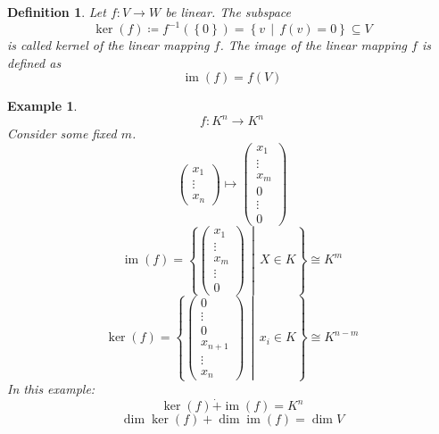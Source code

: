 \documentclass[a4paper,landscape,twocolumn]{article}
\newcommand\set[1]{\left\{#1\right\}}
\newcommand\setdef[2]{\left\{#1\,\middle|\,#2\right\}}
\newtheorem{defi}{Definition}
\newtheorem{ex}{Example}
\begin{document}
\begin{defi}
  Let $f: V \rightarrow W$ be linear.
  The subspace
  \[ \operatorname{ker}(f) \coloneqq f^{-1}(\set{0}) = \setdef{v}{f(v) = 0} \subseteq V \]
  is called \emph{kernel} of the linear mapping $f$.
  The \emph{image} of the linear mapping $f$ is defined as
  \[ \operatorname{im}(f) = f(V) \]
\end{defi}
%
\begin{ex}
  \[ f: K^n \rightarrow K^n \]
  Consider some fixed $m$.
  \[
    \begin{pmatrix} x_1 \\ \vdots \\ x_n \end{pmatrix}
    \mapsto
    \begin{pmatrix} x_1 \\ \vdots \\ x_m \\ 0 \\ \vdots \\ 0 \end{pmatrix}
  \]
  \[
    \operatorname{im}(f) = \setdef{\begin{pmatrix} x_1 \\ \vdots \\ x_m \\ \vdots \\ 0 \end{pmatrix}}{X \in K}
    \cong
    K^m
  \] \[
    \operatorname{ker}(f) = \setdef{\begin{pmatrix} 0 \\ \vdots \\ 0 \\ x_{n+1} \\ \vdots \\ x_n \end{pmatrix}}{x_i \in K}
    \cong K^{n-m}
  \]
  In this example:
  \[ \operatorname{ker}(f) \dot{+} \operatorname{im}(f) = K^n \]
  \[ \dim{\operatorname{ker}(f)} + \dim{\operatorname{im}(f)} = \dim{V} \]
\end{ex}
\end{document}
